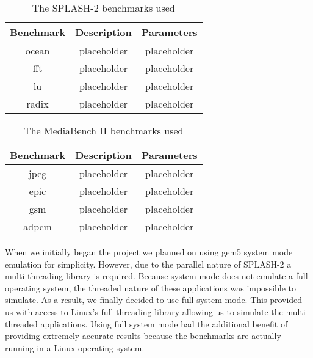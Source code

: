 \begin{table}[!t]
	\renewcommand{\arraystretch}{1.9}
	\label{tab:splash2_benchmarks}
	\centering
	\begin{tabular}{|c|c|c|}
		\hline
		Benchmark & Description & Parameters\\
		\hline
		ocean & placeholder & placeholder\\
		\hline
		fft & placeholder & placeholder\\
		\hline
		lu & placeholder & placeholder\\
		\hline
		radix & placeholder & placeholder\\
		\hline
	\end{tabular}
	\caption{The SPLASH-2 benchmarks used}	
\end{table}

\begin{table}[!t]
	\renewcommand{\arraystretch}{1.9}
	\label{tab:mb2_benchmarks}
	\centering
	\begin{tabular}{|c|c|c|}
		\hline
		Benchmark & Description & Parameters\\
		\hline
		jpeg & placeholder & placeholder\\
		\hline
		epic & placeholder & placeholder\\
		\hline
		gsm & placeholder & placeholder\\
		\hline
		adpcm & placeholder & placeholder\\
		\hline
	\end{tabular}
	\caption{The MediaBench II benchmarks used}	
\end{table}

When we initially began the project we planned on using gem5 system mode emulation for simplicity. However, due to the parallel nature of SPLASH-2 a multi-threading library is required. Because system mode does not emulate a full operating system, the threaded nature of these applications was impossible to simulate. As a result, we finally decided to use full system mode. This provided us with access to Linux's full threading library allowing us to simulate the multi-threaded applications. Using full system mode had the additional benefit of providing extremely accurate results because the benchmarks are actually running in a Linux operating system.

